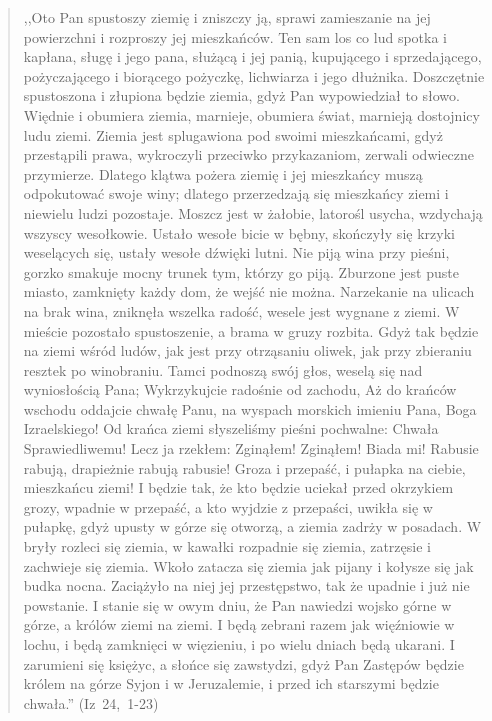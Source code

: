 \documentclass[10pt,a4paper,oneside]{article}
\begin{document}
\begin{quote}
,,Oto Pan spustoszy ziemię i zniszczy ją, sprawi zamieszanie na jej powierzchni i rozproszy jej mieszkańców. Ten sam los co lud spotka i kapłana, sługę i jego pana, służącą i jej panią, kupującego i sprzedającego, pożyczającego i biorącego pożyczkę, lichwiarza i jego dłużnika. Doszczętnie spustoszona i złupiona będzie ziemia, gdyż Pan wypowiedział to słowo. Więdnie i obumiera ziemia, marnieje, obumiera świat, marnieją dostojnicy ludu ziemi. Ziemia jest splugawiona pod swoimi mieszkańcami, gdyż przestąpili prawa, wykroczyli przeciwko przykazaniom, zerwali odwieczne przymierze. Dlatego klątwa pożera ziemię i jej mieszkańcy muszą odpokutować swoje winy; dlatego przerzedzają się mieszkańcy ziemi i niewielu ludzi pozostaje. Moszcz jest w żałobie, latorośl usycha, wzdychają wszyscy wesołkowie. Ustało wesołe bicie w bębny, skończyły się krzyki weselących się, ustały wesołe dźwięki lutni. Nie piją wina przy pieśni, gorzko smakuje mocny trunek tym, którzy go piją. Zburzone jest puste miasto, zamknięty każdy dom, że wejść nie można. Narzekanie na ulicach na brak wina, zniknęła wszelka radość, wesele jest wygnane z ziemi. W mieście pozostało spustoszenie, a brama w gruzy rozbita. Gdyż tak będzie na ziemi wśród ludów, jak jest przy otrząsaniu oliwek, jak przy zbieraniu resztek po winobraniu. Tamci podnoszą swój głos, weselą się nad wyniosłością Pana; Wykrzykujcie radośnie od zachodu, Aż do krańców wschodu oddajcie chwałę Panu, na wyspach morskich imieniu Pana, Boga Izraelskiego! Od krańca ziemi słyszeliśmy pieśni pochwalne: Chwała Sprawiedliwemu! Lecz ja rzekłem: Zginąłem! Zginąłem! Biada mi! Rabusie rabują, drapieżnie rabują rabusie! Groza i przepaść, i pułapka na ciebie, mieszkańcu ziemi! I będzie tak, że kto będzie uciekał przed okrzykiem grozy, wpadnie w przepaść, a kto wyjdzie z przepaści, uwikła się w pułapkę, gdyż upusty w górze się otworzą, a ziemia zadrży w posadach. W bryły rozleci się ziemia, w kawałki rozpadnie się ziemia, zatrzęsie i zachwieje się ziemia. Wkoło zatacza się ziemia jak pijany i kołysze się jak budka nocna. Zaciążyło na niej jej przestępstwo, tak że upadnie i już nie powstanie. I stanie się w owym dniu, że Pan nawiedzi wojsko górne w górze, a królów ziemi na ziemi. I będą zebrani razem jak więźniowie w lochu, i będą zamknięci w więzieniu, i po wielu dniach będą ukarani. I zarumieni się księżyc, a słońce się zawstydzi, gdyż Pan Zastępów będzie królem na górze Syjon i w Jeruzalemie, i przed ich starszymi będzie chwała.'' \mbox{(Iz 24, 1-23)}
\end{quote}
\end{document}
